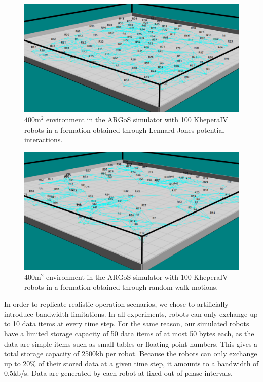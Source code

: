 \documentclass[letterpaper, 10 pt, conference]{ieeeconf}
\begin{document}
\begin{figure}[h]
	\centering
    \includegraphics[width=0.90\columnwidth]{figures/argos_lennard.png}
    \caption{$400 \text{m}^2$ environment in the ARGoS simulator with 100 KheperaIV robots in a formation obtained through Lennard-Jones potential interactions.}
    \label{argos}
\end{figure}

\begin{figure}[h]
	\centering
    \includegraphics[width=0.90\columnwidth]{figures/argos_random.png}
    \caption{$400 \text{m}^2$ environment in the ARGoS simulator with 100 KheperaIV robots in a formation obtained through random walk motions.}
    \label{argos}
\end{figure}

In order to replicate realistic operation scenarios, we chose to artificially introduce bandwidth limitations. In all experiments, robots can only exchange up to 10 data items at every time step. For the same reason, our simulated robots have a limited storage capacity of 50 data items of at most 50 bytes each, as the data are simple items such as small tables or floating-point numbers. This gives a total storage capacity of 2500kb per robot. Because the robots can only exchange up to 20\% of their stored data at a given time step, it amounts to a bandwidth of 0.5kb/s. Data are generated by each robot at fixed out of phase intervals. 
\end{document}
